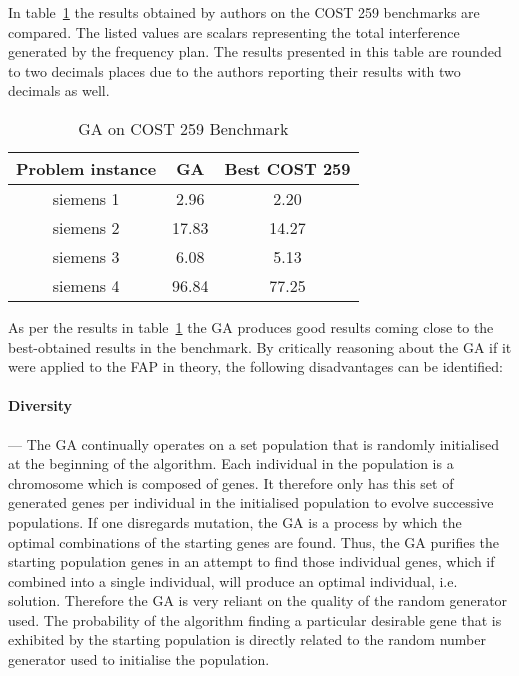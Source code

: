 In table~\ref{tab:GA} the results obtained by authors on the \gls{COST} 259 benchmarks are compared. The listed values are scalars representing the total interference generated by the frequency plan. The results presented in this table are rounded to two decimals places due to the authors reporting their results with two decimals as well.
\begin{table}[H]
\centering
	\begin{tabular}{| c | c | c |}
	\hline
	Problem instance & \gls{GA} & Best \gls{COST} 259 \\ \hline
	siemens 1 & 2.96 & 2.20 \\ \hline
	siemens 2 & 17.83 & 14.27 \\ \hline
	siemens 3 & 6.08 & 5.13 \\ \hline
	siemens 4 & 96.84 & 77.25 \\ \hline
	\end{tabular}
\caption{GA on \gls{COST} 259 Benchmark}
\label{tab:GA}
\end{table}

As per the results in table~\ref{tab:GA} the \gls{GA} produces good results coming close to the best-obtained results in the benchmark. By critically reasoning about the \gls{GA} if it were applied to the \gls{FAP} in theory, the following disadvantages can be identified:

\paragraph{Diversity}
--- The \gls{GA} continually operates on a set population that is randomly initialised at the beginning of the algorithm. Each individual in the population is a chromosome which is composed of genes. It therefore only has this set of generated genes per individual in the initialised population to evolve successive populations.
If one disregards mutation, the \gls{GA} is a process by which the optimal combinations of the starting genes are found. Thus, the \gls{GA} purifies the starting population genes in an attempt to find those individual genes, which if combined into a single individual, will produce an optimal individual, i.e. solution. Therefore the \gls{GA} is very reliant on the quality of the random generator used. The probability of the algorithm finding a particular desirable gene that is exhibited by the starting population is directly related to the random number generator used to initialise the population. 
